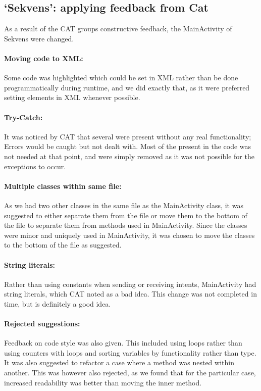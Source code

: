\subsection{`Sekvens': applying feedback from Cat}\label{subsec:collab_sekvensresult}
As a result of the CAT groups constructive feedback, the MainActivity of Sekvens were changed.

\paragraph{Moving code to XML:}
Some code was highlighted which could be set in XML rather than be done programmatically during runtime, and we did exactly that, as it were preferred setting elements in XML whenever possible.

\paragraph{Try-Catch:}
It was noticed by CAT that several  were present without any real functionality; Errors would be caught but not dealt with. Most of the  present in the code was not needed at that point, and were simply removed as it was not possible for the exceptions to occur.

\paragraph{Multiple classes within same file:}
As we had two other classes in the same file as the MainActivity class, it was suggested to either separate them from the file or move them to the bottom of the file to separate them from methods used in MainActivity. Since the classes were minor and uniquely used in MainActivity, it was chosen to move the classes to the bottom of the file as suggested.

\paragraph{String literals:}
Rather than using constants when sending or receiving intents, MainActivity had string literals, which CAT noted as a bad idea. This change was not completed in time, but is definitely a good idea.

\paragraph{Rejected suggestions:}
Feedback on code style was also given. This included using  loops rather than using counters with  loops and sorting variables by functionality rather than type. It was also suggested to refactor a case where a method was nested within another. This was however also rejected, as we found that for the particular case, increased readability was better than moving the inner method.